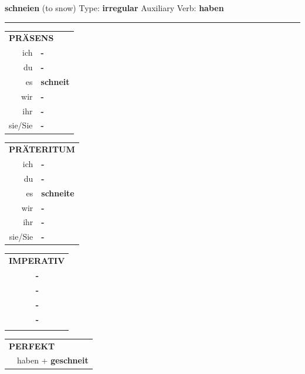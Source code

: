 \documentclass[10pt,a4paper]{revtex4-2}
\begin{document}
\begin{verbbox}
    {\Large \bf schneien} (to snow) \hfill Type: \textbf{irregular} \hfill Auxiliary Verb: \textbf{haben} 
    
     \vspace{5pt}

    \hrule
    
    \vspace{5pt}

  \begin{tabular}{rl}
     \multicolumn{2}{l}{\textbf{PRÄSENS} }\\
    ich & \textbf{-}\\
    du & \textbf{-}\\
    es & \textbf{schneit}\\
    wir & \textbf{-}\\
    ihr & \textbf{-}\\
    sie/Sie & \textbf{-}\\
  \end{tabular}
  \hfill
     \begin{tabular}{rl}
    \multicolumn{2}{l}{\textbf{PRÄTERITUM} }\\
    ich & \textbf{-}\\
    du & \textbf{-}\\
    es & \textbf{schneite}\\
    wir & \textbf{-}\\
    ihr & \textbf{-}\\
    sie/Sie & \textbf{-}\\
  \end{tabular}
  \hfill
  \begin{tabular}{rl}
     \multicolumn{2}{l}{\textbf{IMPERATIV} }\\
   & \textbf{-}\\
   & \textbf{-}\\
   & \textbf{-}\\
   & \textbf{-}\\
   & \vspace{10pt}
  \end{tabular}

    \vspace{10pt}

 \begin{tabular}{rl}
     \multicolumn{2}{l}{\textbf{PERFEKT}}\\
  &  haben + \textbf{geschneit}\\
  \end{tabular}
\hfill
   \begin{tabular}{rl}
   

\end{tabular}
\end{verbbox}
\end{document}
